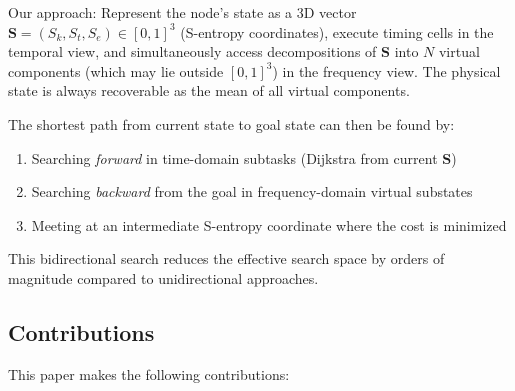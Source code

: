 \documentclass[twocolumn,11pt,a4paper]{article}
\newcommand{\Sk}{S_k}
\newcommand{\St}{S_t}
\newcommand{\Se}{S_e}
\newcommand{\Stuple}{\mathbf{S}}
\begin{document}
Our approach: Represent the node's state as a 3D vector $\Stuple = (\Sk, \St, \Se) \in [0,1]^3$ (S-entropy coordinates), execute timing cells in the temporal view, and simultaneously access decompositions of $\Stuple$ into $N$ virtual components (which may lie outside $[0,1]^3$) in the frequency view. The physical state is always recoverable as the mean of all virtual components.

The shortest path from current state to goal state can then be found by:
\begin{enumerate}[nosep]
  \item Searching \emph{forward} in time-domain subtasks (Dijkstra from current $\Stuple$)
  \item Searching \emph{backward} from the goal in frequency-domain virtual substates
  \item Meeting at an intermediate S-entropy coordinate where the cost is minimized
\end{enumerate}

This bidirectional search reduces the effective search space by orders of magnitude compared to unidirectional approaches.

\subsection{Contributions}

This paper makes the following contributions:
\end{document}

